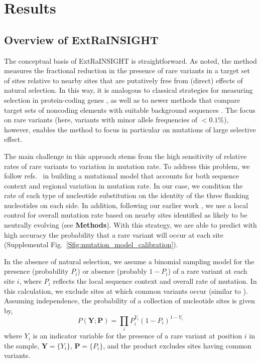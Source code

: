 \documentclass[11pt]{article}
\newcommand{\mathbb}[1]{\boldsymbol{\mathbf{#1}}}
\begin{document}
\section*{Results}

\subsection*{Overview of ExtRaINSIGHT}

The conceptual basis of ExtRaINSIGHT is straightforward.  As noted, the method measures the fractional reduction in the presence of rare variants in a target set of sites relative to nearby sites that are putatively free from (direct) effects of natural selection.  In this way, it is analogous to classical strategies for measuring selection in protein-coding genes \cite{LIETAL81,KIMU83,KONDCROW93}, as well as to newer methods that compare target sets of noncoding elements with suitable background sequences \cite{SIEPETAL05,COOPETAL05,GAFFETAL08,ARBIETAL13}.  The focus on rare variants (here, variants with minor allele frequencies of $< 0.1$\%), however, enables the method to focus in particular on mutations of large selective effect.

The main challenge in this approach stems from the high sensitivity of relative rates of rare variants to variation in mutation rate.  To address this problem, we follow refs.\ \cite{SAMOETAL14,LEKETAL16} in building a mutational model that accounts for both sequence context and regional variation in mutation rate.  In our case, we condition the rate of each type of nucleotide substitution on the identity of the three flanking nucleotides on each side.  In addition, following our earlier work \cite{ARBIETAL13,GRONETAL13}, we use a local control for overall mutation rate based on nearby
sites identified as likely to be neutrally evolving (see {\bf Methods}).  With this strategy, we are able to predict with high accuracy the probability that a rare variant will occur at each site (Supplemental Fig.\ \ref{Sfig:mutation_model_calibration}).


In the absence of natural selection, we assume a  binomial sampling model for the presence (probability $P_i$) or absence (probably $1-P_i$) of a rare variant at each site $i$, where $P_i$ reflects the local sequence context and overall rate of mutation.  In this calculation, we exclude sites at which common variants occur (similar to \cite{SAMOETAL14,LEKETAL16}).
Assuming independence, the probability of a collection of nucleotide sites is given by,
\begin{equation}
P(\mathbb{Y}; \mathbb{P}) = \prod_i P_i^{Y_i}(1-P_i)^{1-Y_i}
\end{equation}
\noindent where $Y_i$ is an indicator variable for the presence of a rare variant at position $i$ in the sample, $\mathbb{Y} = \{Y_i\}$, $\mathbb{P} = \{P_i\}$,  and the product excludes sites having common variants.
\end{document}
